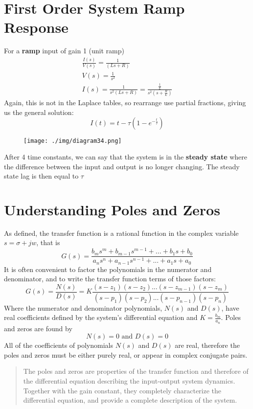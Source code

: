 \section{First Order System Ramp Response}
For a \textbf{ramp} input of gain 1 (unit ramp)
\begin{gather}
  \frac{I(s)}{V(s)} = \frac{1}{(Ls+R)}\\
  V(s) = \frac{1}{s^2}\\
  I(s) = \frac{1}{s^2(Ls+R)} = \frac{\frac{1}{L}}{s^2(s+\frac{R}{L})}
\end{gather}
Again, this is not in the Laplace tables, so rearrange use partial fractions, giving us the general solution:
\begin{equation}
  I(t) = t - \tau \left(1 - e^{-\frac{t}{\tau}}\right)
\end{equation}
\begin{figure}[H]
  \centering
  \texttt{[image: ./img/diagram34.png]}
\end{figure}
After 4 time constants, we can say that the system is in the \textbf{steady state} where the difference between the input and output is no longer changing. The steady state lag is then equal to $\tau$
\section{Understanding Poles and Zeros}
As defined, the transfer function is a rational function in the complex variable $s = \sigma + jw$, that is
\begin{equation}
  G(s)=\frac{b_ms^m + b_{m-1}s^{m-1} + ... + b_1s + b_0}{a_ns^n + a_{n-1}s^{n-1}+...+a_1s + a_0}
\end{equation}
It is often convenient to factor the polynomials in the numerator and denominator, and to write the transfer function terms of those factors:
\begin{equation}
  G(s) = \frac{N(s)}{D(s)} = K \frac{(s-z_1)(s-z_2)...(s-z_{m-1})(s-z_m)}{(s-p_1)(s-p_2)...(s-p_{n-1})(s-p_n)}
\end{equation}
Where the numerator and denominator polynomials, $N(s)$ and $D(s)$, have real coefficients defined by the system's differential equation and $K = \frac{b_m}{a_n}$. Poles and zeros are found by
\begin{equation}
  N(s) = 0 \textrm{ and } D(s) = 0
\end{equation}
All of the coefficients of polynomials $N(s)$ and $D(s)$ are real, therefore  the poles and zeros must be either purely real, or appear in complex conjugate pairs.
\begin{quotation}
  The poles and zeros are properties of the transfer function and therefore of the differential equation describing the input-output system dynamics. Together with the gain constant, they completely characterize the differential equation, and provide a complete description of the system.
\end{quotation}
